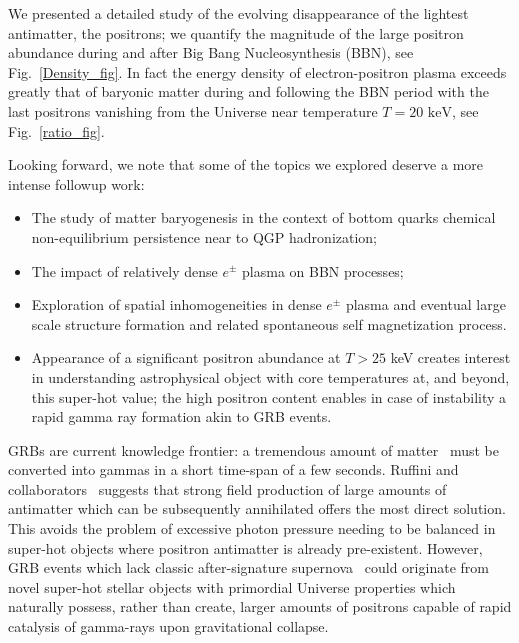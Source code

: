 \documentclass[universe,article,submit,moreauthors,pdftex,a4paper]{Definitions/mdpi}
\newcommand{\keV}{\text{ keV}}
\newcommand*{\rf}[1]{Fig.~{\ref{#1}}}
\begin{document}
We presented a detailed study of the evolving disappearance of the lightest antimatter, the positrons; we quantify the magnitude of the large positron abundance during and after Big Bang Nucleosynthesis (BBN), see \rf{Density_fig}. In fact the energy density of electron-positron plasma exceeds greatly that of baryonic matter during and following the BBN period with the last positrons vanishing from the Universe near temperature $T=20\keV$, see \rf{ratio_fig}. 

Looking forward, we note that some of the topics we explored deserve a more intense followup work:
\begin{itemize}
 \item The study of matter baryogenesis in the context of bottom quarks chemical non-equilibrium persistence near to QGP hadronization;
 \item The impact of relatively dense $e^{\pm}$ plasma on BBN processes;
 \item Exploration of spatial inhomogeneities in dense $e^{\pm}$ plasma and eventual large scale structure formation and related spontaneous self magnetization process. 
 \item Appearance of a significant positron abundance at $T>25$ keV creates interest in understanding astrophysical object with core temperatures at, and beyond, this super-hot value; the high positron content enables in case of instability a rapid gamma ray formation akin to GRB events. 
\end{itemize}

GRBs are current knowledge frontier:  a tremendous amount of matter~\cite{Aksenov:2010vi} must be converted into gammas in a short time-span of a few seconds. Ruffini and collaborators~\cite{Ruffini:2001fe,Ruffini:2003yt,Ruffini:2009hg,Aksenov:2008zz,Ruffini:2012it,Han:2011er} suggests that strong field production of large amounts of antimatter which can be subsequently annihilated offers the most direct solution. This avoids the problem of excessive photon pressure needing to be balanced in super-hot objects where positron antimatter is already pre-existent. However, GRB events which lack classic  after-signature supernova~\cite{Burns:2023oxn,Levan:2023doz} could originate from novel super-hot stellar objects with primordial Universe properties which naturally possess, rather than create, larger amounts of positrons capable of rapid catalysis of gamma-rays upon gravitational collapse. 
\end{document}
